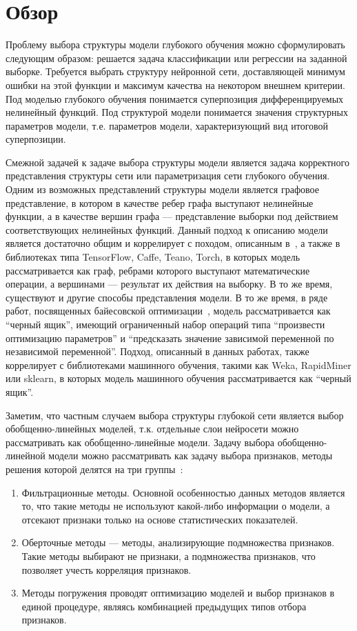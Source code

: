 \newpage{}
\chapter*{Обзор}
Проблему выбора структуры модели глубокого обучения можно сформулировать следующим образом: решается задача классификации или регрессии на заданной выборке. Требуется выбрать структуру нейронной сети, доставляющей минимум ошибки на этой функции и максимум качества на некотором внешнем критерии. Под моделью глубокого обучения понимается суперпозиция дифференцируемых нелинейный функций. Под структурой модели понимается значения структурных параметров модели, т.е. параметров модели, характеризующий вид итоговой суперпозиции. 


Смежной задачей к задаче выбора структуры модели является задача корректного представления структуры сети или параметризация сети глубокого обучения. Одним из возможных представлений структуры модели является графовое представление, в котором в качестве ребер графа выступают нелинейные функции, а в качестве вершин графа --- представление выборки под действием соответствующих нелинейных функций. 
Данный подход к описанию модели является достаточно общим и коррелирует с походом, описанным в~\cite{vokov}, а также в библиотеках типа TensorFlow, Caffe, Teano, Torch, в которых модель рассматривается как граф, ребрами которого выступают математические операции, а вершинами --- результат их действия на выборку. 
 В то же время, существуют и другие способы представления модели. В то же время, в ряде работ, посвященных байесовской оптимизации~\cite{snoek_deep,rbf_surrogate,bo_gp}, модель рассматривается как ``черный ящик'', имеющий ограниченный набор операций типа ``произвести оптимизацию параметров'' и ``предсказать значение зависимой переменной по независимой переменной''.
Подход, описанный в данных работах, также коррелирует с  библиотеками машинного обучения, такими как Weka, RapidMiner или sklearn, в которых модель машинного обучения рассматривается как ``черный ящик''.


Заметим, что частным случаем выбора структуры глубокой сети является выбор обобщенно-линейных моделей, т.к. отдельные слои нейросети можно рассматривать как обобщенно-линейные модели. Задачу выбора обобщенно-линейной модели можно рассматривать как задачу выбора признаков, методы решения которой делятся на три группы~\cite{feature_select}:
\begin{enumerate}
\item Фильтрационные методы. Основной особенностью данных методов является то, что такие методы не используют какой-либо информации о модели, а отсекают признаки только на основе статистических показателей. 
\item Оберточные методы --- методы, анализирующие подмножества признаков. Такие методы выбирают не признаки, а подмножества признаков, что позволяет учесть корреляция признаков.
\item Методы погружения проводят оптимизацию моделей и выбор признаков в единой процедуре, являясь комбинацией предыдущих типов отбора признаков.
\end{enumerate} 

